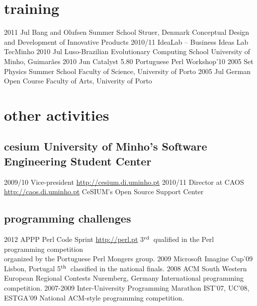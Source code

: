 \documentclass[a4paper]{friggeri-cv}
\begin{document}
\section{training}
\begin{entrylist}
	\entry
		{2011 {\footnotesize Jul}}
		{Bang and Olufsen Summer School}
		{Struer, Denmark}
		{Conceptual Design and Development of Innovative Products}
	\entry
		{2010/11}
		{IdeaLab -- Business Ideas Lab}
		{TecMinho}
		{\vspace{-0.8cm}}
	\entry
		{2010 {\footnotesize Jul}}
		{Luso-Brazilian Evolutionary Computing School}
		{University of Minho, Guimarães}
		{\vspace{-0.8cm}}
	\entry
		{2010 {\footnotesize Jun}}
		{Catalyst 5.80}
		{Portuguese Perl Workshop'10}
		{\vspace{-0.8cm}}
	\entry
		{2005 {\footnotesize Set}}
		{Physics Summer School}
		{Faculty of Science, University of Porto}
		{\vspace{-0.8cm}}
	\entry
		{2005 {\footnotesize Jul}}
		{German Open Course}
		{Faculty of Arts, Univerity of Porto}
		{\vspace{-0.8cm}}
\end{entrylist}


\section{other activities}
\subsection{cesium {\normalfont\small University of Minho's Software Engineering Student Center}}{}
\begin{entrylist}
  \entry
    {2009/10}
    {Vice-president}
    {\href{http://cesium.di.uminho.pt}{http://cesium.di.uminho.pt}}
    {\vspace{-.8cm}}
  \entry
    {2010/11}
    {Director at CAOS}
    {\href{http://caos.di.uminho.pt}{http://caos.di.uminho.pt}}
    {CeSIUM's Open Source Support Center}
\end{entrylist}

\subsection{programming challenges}{}
\begin{entrylist}
  \entry
    {2012}
    {APPP Perl Code Sprint}
	{\href{http://perl.pt}{http://perl.pt}}
    {3$^{\footnotesize\textrm{rd}}$~qualified in the Perl programming competition\\organized by the Portuguese Perl Mongers group.}
  \entry
    {2009}
    {Microsoft Imagine Cup'09}
	{Lisbon, Portugal}
    {5$^{\footnotesize\textrm{th}}$~classified in the national finals.}
  \entry
    {2008}
    {ACM South Western European Regional Contests}
	{Nuremberg, Germany}
    {International programming competition.}
  \entry
    {2007-2009}
    {Inter-University Programming Marathon}
	{IST'07, UC'08, ESTGA'09}
    {National ACM-style programming competition.}
\end{entrylist}
\end{document}
